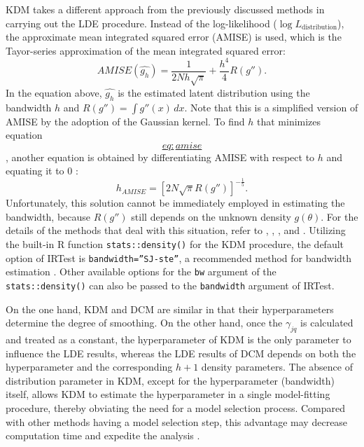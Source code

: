 KDM takes a different approach from the previously discussed methods in
carrying out the LDE procedure. Instead of the log-likelihood
(\(\log{L_{\text{distribution}}}\)), the approximate mean integrated
squared error (AMISE) is used, which is the Tayor-series approximation
of the mean integrated squared error:
\[AMISE{\left( \hat{g_h} \right)} =
\frac{1}{2 N h \sqrt{\pi}} +
\frac{h^{4}}{4} R{\left( g'' \right)}.
\label{eq:amise}\] In the equation above, \(\hat{g_h}\) is the estimated
latent distribution using the bandwidth \(h\) and
\(R{\left( g'' \right)} = \int{g''{( x )} \, dx}\). Note that this is a
simplified version of AMISE by the adoption of the Gaussian kernel. To
find \(h\) that minimizes equation
\protect\hyperlink{eq:amise}{\[eq:amise\]},
another equation is obtained by differentiating AMISE with respect to
\(h\) and equating it to 0
\citep{Gramacki:2018, Silverman:1986, Wand+Jones:1995}: \[h_{AMISE} =
\left[
2 N \sqrt{\pi} R{\left( g'' \right)}
\right]^{- \frac{1}{5}} .
\label{eq:amiseh}\] Unfortunately, this solution cannot be immediately
employed in estimating the bandwidth, because \(R{\left( g'' \right)}\)
still depends on the unknown density \(g{(\theta)}\). For the details of
the methods that deal with this situation, refer to \citet{Silverman:1986},
\citet{Gramacki:2018}, \citet{Sheather:2004}, and \citet{Wand+Jones:1995}. Utilizing the
built-in R function \texttt{stats::density()} for the KDM procedure, the
default option of IRTest is \texttt{bandwidth=”SJ-ste”}, a recommended method
for bandwidth estimation
\citep{Jones+Marron+Sheather:1996, Sheather+Jones:1991}. Other available
options for the \texttt{bw} argument of the \texttt{stats::density()} can also be
passed to the \texttt{bandwidth} argument of IRTest.

On the one hand, KDM and DCM are similar in that their hyperparameters
determine the degree of smoothing. On the other hand, once the
\(\gamma_{jq}\) is calculated and treated as a constant, the
hyperparameter of KDM is the only parameter to influence the LDE
results, whereas the LDE results of DCM depends on both the
hyperparameter and the corresponding \(h+1\) density parameters. The
absence of distribution parameter in KDM, except for the hyperparameter
(bandwidth) itself, allows KDM to estimate the hyperparameter in a
single model-fitting procedure, thereby obviating the need for a model
selection process. Compared with other methods having a model selection
step, this advantage may decrease computation time and expedite the
analysis \citep{Li:2022}.

